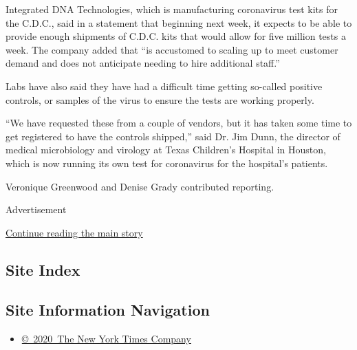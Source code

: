 Integrated DNA Technologies, which is manufacturing coronavirus test
kits for the C.D.C., said in a statement that beginning next week, it
expects to be able to provide enough shipments of C.D.C. kits that would
allow for five million tests a week. The company added that ``is
accustomed to scaling up to meet customer demand and does not anticipate
needing to hire additional staff.''

Labs have also said they have had a difficult time getting so-called
positive controls, or samples of the virus to ensure the tests are
working properly.

``We have requested these from a couple of vendors, but it has taken
some time to get registered to have the controls shipped,'' said Dr. Jim
Dunn, the director of medical microbiology and virology at Texas
Children's Hospital in Houston, which is now running its own test for
coronavirus for the hospital's patients.

Veronique Greenwood and Denise Grady contributed reporting.

Advertisement

\protect\hyperlink{after-bottom}{Continue reading the main story}

\hypertarget{site-index}{%
\subsection{Site Index}\label{site-index}}

\hypertarget{site-information-navigation}{%
\subsection{Site Information
Navigation}\label{site-information-navigation}}

\begin{itemize}
\tightlist
\item
  \href{https://help.nytimes3xbfgragh.onion/hc/en-us/articles/115014792127-Copyright-notice}{©~2020~The
  New York Times Company}
\end{itemize}

